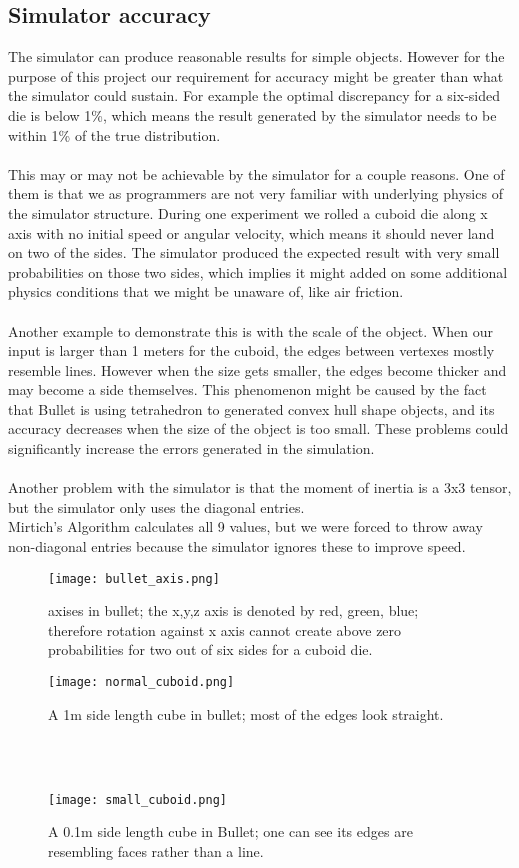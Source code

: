 \subsection{Simulator accuracy}
The simulator can produce reasonable results for simple objects. However for the purpose of this project our requirement for accuracy might be greater than what the simulator could sustain. For example the optimal discrepancy for a six-sided die is below 1\%, which means the result generated by the simulator needs to be within 1\% of the true distribution.\\\\
This may or may not be achievable by the simulator for a couple reasons. One of them is that we as programmers are not very familiar with underlying physics of the simulator structure. During one experiment we rolled a cuboid die along x axis with no initial speed or angular velocity, which means it should never land on two of the sides. The simulator produced the expected result with very small probabilities on those two sides, which implies it might added on some additional physics conditions that we might be unaware of, like air friction.\\\\
Another example to demonstrate this is with the scale of the object. When our input is larger than 1 meters for the cuboid, the edges between vertexes mostly resemble lines. However when the size gets smaller, the edges become thicker and may become a side themselves. This phenomenon might be caused by the fact that Bullet is using tetrahedron to generated convex hull shape objects, and its accuracy decreases when the size of the object is too small. These problems could significantly increase the errors generated in the simulation.\\\\
Another problem with the simulator is that the moment of inertia is a 3x3 tensor, but the simulator only uses the diagonal entries.\\ Mirtich's Algorithm \cite{Mirtich:1996:FAC:643318.643322} calculates all 9 values, but we were forced to throw away non-diagonal entries because the simulator ignores these to improve speed.\\
\begin{figure}[h]
\center
\texttt{[image: bullet\_axis.png]}
\caption{axises in bullet; the x,y,z axis is denoted by red, green, blue; therefore rotation against x axis cannot create above zero probabilities for two out of six sides for a cuboid die.}
\label{fig:f2}
\end{figure}
\begin{figure}[h]
\center
\texttt{[image: normal\_cuboid.png]}
\caption{A 1m side length cube in bullet; most of the edges look straight.}
\label{fig:f3}
\end{figure}\\\\
\begin{figure}[h]
\center
\texttt{[image: small\_cuboid.png]}
\caption{A 0.1m side length cube in Bullet; one can see its edges are resembling faces rather than a line.}
\label{fig:f4}
\end{figure}\\\\